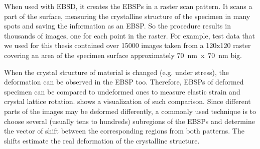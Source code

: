 When used with EBSD, it creates the EBSPs in a raster scan pattern. It scans a part of the surface, measuring the crystalline structure of the specimen in many spots and saving the information as an EBSP. So the procedure results in thousands of images, one for each point in the raster. For example, test data that we used for this thesis contained over 15000 images taken from a 120x120 raster covering an area of the specimen surface approximately \SI{70}{\nano\meter}~x~\SI{70}{\nano\meter} big.

When the crystal structure of material is changed (e.g. under stress), the deformation can be observed in the EBSP too. Therefore, EBSPs of deformed specimen can be compared to undeformed ones to measure elastic strain and crystal lattice rotation.   shows a visualization of such comparison. Since different parts of the images may be deformed differently, a commonly used technique \cite{wilkinson2006high,wilkinson2010high,britton2012high} is to choose several (usually tens to hundreds) subregions of the EBSPs and determine the vector of shift between the corresponding regions from both patterns. The shifts estimate the real deformation of the crystalline structure.

